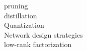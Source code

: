 \documentclass[../../D1.tex]{subfiles}
\begin{document}
pruning\\
distillation\\
Quantization\\
Network design strategies\\
low-rank factorization
\end{document}

